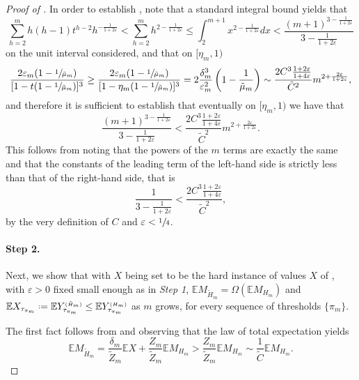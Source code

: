 \documentclass[11pt, a4paper, twoside]{article}
\newcommand*{\defeq}{\mathrel{\vcenter{\baselineskip0.5ex \lineskiplimit0pt
			\hbox{\scriptsize.}\hbox{\scriptsize.}}}=}
\newcommand{\ssup}[1]{{\scriptscriptstyle{({#1})}}}
\newcommand{\eps}{\varepsilon}
\newcommand{\EE}{\mathbb{E}}
\numberwithin{equation}{section}
\begin{document}
\begin{proof}[Proof of ]
		In order to establish , note that a standard integral bound yields that
		\[\sum_{h=2}^m h(h-1)t^{h-2} h^{-\frac{1}{1+2\eps}}<\sum_{h=2}^m h^{2-\frac{1}{1+2\eps}}\le\int_2^{m+1}x^{2-\frac{1}{1+2\eps}}dx<\frac{(m+1)^{3-\frac{1}{1+2\eps}}}{3-\frac{1}{1+2\eps}}\]
		on the unit interval considered, and that on $[\eta_m,1)$
		\[\frac{2\eps_m(1-\sfrac{1}{\tilde{\mu}_m})}{[1-t(1-\sfrac{1}{\tilde{\mu}_m})]^3}\ge \frac{2\eps_m(1-\sfrac{1}{\tilde{\mu}_m})}{[1-\eta_m(1-\sfrac{1}{\tilde{\mu}_m})]^3}=2\frac{\delta_m^3}{\eps_m^2}\left(1-\frac{1}{\tilde{\mu}_m}\right)\sim\frac{2C^3\frac{1+2\eps}{1+4\eps}}{\tilde{C}^2}m^{2+\frac{2\eps}{1+2\eps}},\]
		and therefore it is sufficient to establish that eventually on $[\eta_m,1)$ we have that
		\begin{equation}\label{concave2}
			\frac{(m+1)^{3-\frac{1}{1+2\eps}}}{3-\frac{1}{1+2\eps}}< \frac{2C^3\frac{1+2\eps}{1+4\eps}}{\tilde{C}^2}m^{2+\frac{2\eps}{1+2\eps}}.
		\end{equation}
		This follows from noting that the powers of the $m$ terms are exactly the same and that the constants of the leading term of the left-hand side is strictly less than that of the right-hand side, that is
		\[\frac{1}{3-\frac{1}{1+2\eps}}<\frac{2C^3\frac{1+2\eps}{1+4\eps}}{\tilde{C}^2},\]
		by the very definition of $C$ and $\eps<\sfrac{1}{4}$.
		
		\paragraph{Step 2.} Next, we show that with $X$ being set to be the hard instance of values $X$ of , with $\eps>0$ fixed small enough as in \emph{Step 1}, $\EE M_{\tilde{H}_m}=\Omega (\EE M_{H_m})$ and $\EE X_{\tau_{\pi_m}}\defeq \EE Y_{\tau_{\pi_m}}^\ssup{\tilde{H}_m}\le \EE Y_{\tau_{\pi_m}}^\ssup{H_m}$ as $m$ grows, for every sequence of thresholds $\{\pi_m\}$. 
		
		The first fact follows from  and observing that the law of total expectation yields
		\[\EE M_{\tilde{H}_m}=\frac{\delta_m}{\tilde{Z}_m} \EE X +\frac{Z_m}{\tilde{Z}_m}\EE M_{H_m}>\frac{Z_m}{\tilde{Z}_m}\EE M_{H_m}\sim\frac{1}{\tilde{C}}\EE M_{H_m}.\]
		

\end{proof}
\end{document}
